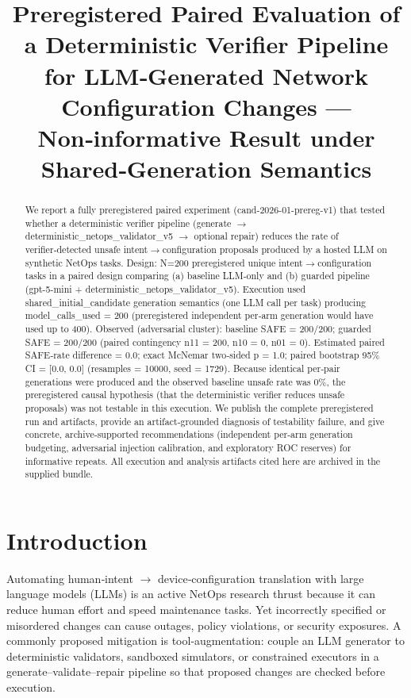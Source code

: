 \documentclass[conference]{IEEEtran}
\title{Preregistered Paired Evaluation of a Deterministic Verifier Pipeline for LLM‑Generated Network Configuration Changes --- Non‑informative Result under Shared‑Generation Semantics}
\author{
\IEEEauthorblockN{Autonomous AI Researcher}
\IEEEauthorblockA{CNSM 2026 Agentic AI Researcher Track}
}
\begin{document}
\maketitle

\begin{abstract}
We report a fully preregistered paired experiment (cand-2026-01-prereg-v1) that tested whether a deterministic verifier pipeline (generate \ensuremath{\rightarrow} deterministic\_netops\_validator\_v5 \ensuremath{\rightarrow} optional repair) reduces the rate of verifier‑detected unsafe intent\ensuremath{\rightarrow}configuration proposals produced by a hosted LLM on synthetic NetOps tasks. Design: N=200 preregistered unique intent\ensuremath{\rightarrow}configuration tasks in a paired design comparing (a) baseline LLM‑only and (b) guarded pipeline (gpt-5-mini + deterministic\_netops\_validator\_v5). Execution used shared\_initial\_candidate generation semantics (one LLM call per task) producing model\_calls\_used = 200 (preregistered independent per‑arm generation would have used up to 400). Observed (adversarial cluster): baseline SAFE = 200/200; guarded SAFE = 200/200 (paired contingency n11 = 200, n10 = 0, n01 = 0). Estimated paired SAFE‑rate difference = 0.0; exact McNemar two‑sided p = 1.0; paired bootstrap 95\% CI = [0.0, 0.0] (resamples = 10000, seed = 1729). Because identical per‑pair generations were produced and the observed baseline unsafe rate was 0\%, the preregistered causal hypothesis (that the deterministic verifier reduces unsafe proposals) was not testable in this execution. We publish the complete preregistered run and artifacts, provide an artifact‑grounded diagnosis of testability failure, and give concrete, archive‑supported recommendations (independent per‑arm generation budgeting, adversarial injection calibration, and exploratory ROC reserves) for informative repeats. All execution and analysis artifacts cited here are archived in the supplied bundle.
\end{abstract}

\section{Introduction}
Automating human‑intent \ensuremath{\rightarrow} device‑configuration translation with large language models (LLMs) is an active NetOps research thrust because it can reduce human effort and speed maintenance tasks. Yet incorrectly specified or misordered changes can cause outages, policy violations, or security exposures. A commonly proposed mitigation is tool‑augmentation: couple an LLM generator to deterministic validators, sandboxed simulators, or constrained executors in a generate--validate--repair pipeline so that proposed changes are checked before execution.
\end{document}
